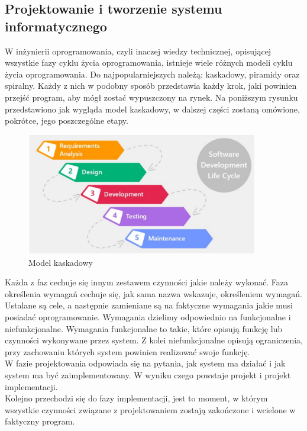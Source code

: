 \documentclass[12pt]{article}
\begin{document}
\begin{sloppypar}
{  \subsection{Projektowanie i tworzenie systemu informatycznego}
  {
    W inżynierii oprogramowania, czyli inaczej wiedzy technicznej, opisującej wszystkie fazy cyklu życia oprogramowania, istnieje wiele różnych modeli 
    cyklu życia oprogramowania. Do najpopularniejszych należą: kaskadowy, piramidy oraz spiralny. Każdy z nich w podobny sposób przedstawia każdy krok, 
    jaki powinien przejść program, aby mógł zostać wypuszczony na rynek. Na poniższym rysunku przedstawiono jak wygląda model kaskadowy, w dalszej części zostaną 
    omówione, pokrótce, jego poszczególne etapy.
    \begin{figure}[H]
      \centering
      \includegraphics[width=0.9\textwidth]{model_kaskadowy}
      \caption{Model kaskadowy \cite{cascade}}
      \label{fig:cascade}
    \end{figure}
    Każda z faz cechuje się innym zestawem czynności jakie należy wykonać. 
    Faza określenia wymagań cechuje się, jak sama nazwa wskazuje, określeniem wymagań. Ustalane są cele, a następnie zamieniane są na faktyczne wymagania 
    jakie musi posiadać oprogramowanie. Wymagania dzielimy odpowiednio na funkcjonalne i niefunkcjonalne. 
    Wymagania funkcjonalne to takie, które opisują funkcję lub czynności wykonywane przez system. 
    Z kolei niefunkcjonalne opisują ograniczenia, przy zachowaniu których system powinien realizować swoje funkcję.\\
    W fazie projektowania odpowiada się na pytania, jak system ma działać i jak system ma być zaimplementowany. W wyniku czego powstaje projekt i projekt implementacji.\\
    Kolejno przechodzi się do fazy implementacji, jest to moment, w którym wszystkie czynności związane z projektowaniem zostają zakończone i wcielone w faktyczny program.\\
}}
\end{sloppypar}
\end{document}
